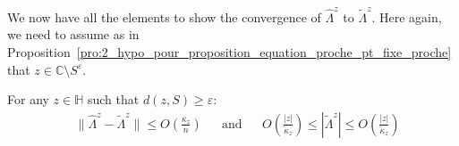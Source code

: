 \documentclass[a4papaer, titlepage]{book}
\begin{document}
  We now have all the elements to show the convergence of $\hat \Lambda^z$ to $\tilde \Lambda^z$. Here again, we need to assume as in Proposition~\ref{pro:2_hypo_pour_proposition_equation_proche_pt_fixe_proche} that $z \in \mathbb C \setminus S^{\varepsilon}$.
  \begin{proposition}\label{pro:hat_lambda_vers_tilde_lambda}
    For any $z \in \mathbb H$ such that $d(z, S) \geq \varepsilon$:%
    \begin{align*}
      &\| \hat \Lambda^z - \tilde \Lambda^z\| \leq O \left(\frac{\kappa_z}{n}\right)&
      &\text{and}&
      &O \left(\frac{|z|}{\check \kappa_z} \right)\leq |\tilde \Lambda^z| \leq O \left(\frac{|z|}{\check \kappa_z} \right)
    \end{align*}
  \end{proposition}
\end{document}
